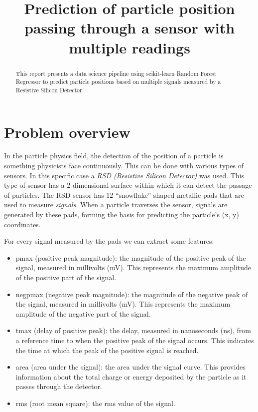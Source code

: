 \documentclass[conference]{IEEEtran}
\begin{document}
\title{Prediction of particle position passing through a sensor with multiple readings}

\author{
}

\maketitle

\begin{abstract}
This report presents a data science pipeline using scikit-learn Random Forest Regressor to 
predict particle positions based on multiple signals measured by a Resistive Silicon Detector.
\end{abstract}


\section{Problem overview}
In the particle physics field, the detection of the position of a particle is something physicists face continuously. 
This can be done with various types of sensors. In this specific case a \textit{RSD (Resistive Silicon Detector)} 
was used. This type of sensor has a 2-dimensional surface within which it can detect the passage of particles.
The RSD sensor has 12 “snowflake” shaped metallic pads that are used to measure \textit{signals}. 
When a particle traverses the sensor, signals are generated by these pads, forming the basis for predicting 
the particle's (x, y) coordinates.

For every signal measured by the pads we can extract some features:
\begin{itemize}
    \item pmax (positive peak magnitude): the magnitude of the positive peak of the signal, measured in millivolts (mV). 
    This represents the maximum amplitude of the positive part of the signal.
    \item negpmax (negative peak magnitude): the magnitude of the negative peak of the signal, measured in millivolts (mV). 
    This represents the maximum amplitude of the negative part of the signal.
    \item tmax (delay of positive peak): the delay, measured in nanoseconds (ns), from a reference time to when 
    the positive peak of the signal occurs. 
    This indicates the time at which the peak of the positive signal is reached.
    \item area (area under the signal): the area under the signal curve.
    This provides information about the total charge or energy deposited by the particle as it passes through the detector.
    \item rms (root mean square): the rms value of the signal.
\end{itemize}
\end{document}
